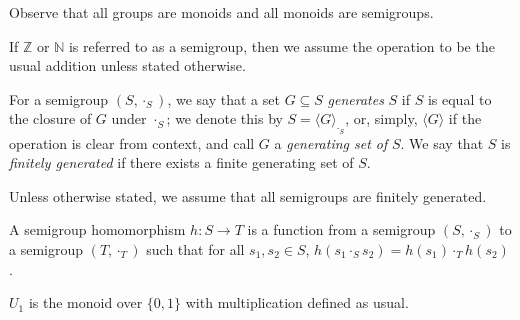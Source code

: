 \documentclass[a4paper,UKenglish,cleveref, autoref, thm-restate, anonymous]{lipics-v2021}
\begin{document}
\begin{remark}
    Observe that all groups are monoids and all monoids are semigroups.
\end{remark}

\begin{remark}
    If $\mathbb{Z}$ or $\mathbb{N}$ is referred to as a semigroup, then we assume the operation to be the usual addition unless stated otherwise.
\end{remark}

\begin{definition}
    For a semigroup $(S, \cdot_S)$, we say that a set $G \subseteq S$ \emph{generates} $S$ if $S$ is equal to the closure of $G$ under $\cdot_S$; we denote this by $S = \langle G \rangle_{\cdot_S}$, or, simply, $\langle G \rangle$ if the operation is clear from context, and call $G$ a \emph{generating set of} $S$. We say that $S$ is \emph{finitely generated} if there exists a finite generating set of $S$.
\end{definition}

\begin{remark}
    Unless otherwise stated, we assume that all semigroups are finitely generated.
\end{remark}

\begin{definition}
    A semigroup homomorphism $h : S \rightarrow T$ is a function from a semigroup $(S, \cdot_S)$ to a semigroup $(T, \cdot_T)$ such that for all $s_1, s_2 \in S$, $h(s_1 \cdot_S s_2) = h(s_1) \cdot_T h(s_2)$.
\end{definition}

\iffalse
TODO: remove / move elsewhere
\begin{definition}
    A semigroup $S'$ is a \emph{subsemigroup} of a semigroup $(S, \cdot)$, denoted $S' \leq S$, if it is isomorphic to a semigroup $(S'', \cdot)$ where $S'' \subseteq S$.
\end{definition}

\begin{definition}
    A semigroup $S'$ \emph{divides} a semigroup $S$, denoted $S' \preceq S$, if there exists a subsemigroup $S''$ of $S$ and a surjective homomorphism from $S''$ onto $S'$. In other words, $S'$ divides $S$ if $S'$ is the homomorphic image of a subsemigroup of $S$.
\end{definition}
\fi

\begin{definition}
    $U_1$ is the monoid over $\{0,1\}$ with multiplication defined as usual.
\end{definition}
\end{document}
